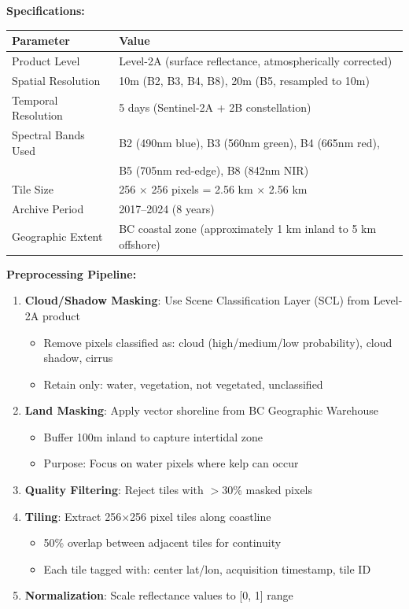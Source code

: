 \documentclass[11pt]{article}
\begin{document}
\textbf{Specifications:}
\begin{center}
\begin{tabular}{ll}
\toprule
\textbf{Parameter} & \textbf{Value} \\
\midrule
Product Level & Level-2A (surface reflectance, atmospherically corrected) \\
Spatial Resolution & 10m (B2, B3, B4, B8), 20m (B5, resampled to 10m) \\
Temporal Resolution & 5 days (Sentinel-2A + 2B constellation) \\
Spectral Bands Used & B2 (490nm blue), B3 (560nm green), B4 (665nm red), \\
 & B5 (705nm red-edge), B8 (842nm NIR) \\
Tile Size & 256 $\times$ 256 pixels = 2.56 km $\times$ 2.56 km \\
Archive Period & 2017--2024 (8 years) \\
Geographic Extent & BC coastal zone (approximately 1 km inland to 5 km offshore) \\
\bottomrule
\end{tabular}
\end{center}

\textbf{Preprocessing Pipeline:}
\begin{enumerate}
    \item \textbf{Cloud/Shadow Masking}: Use Scene Classification Layer (SCL) from Level-2A product
    \begin{itemize}
        \item Remove pixels classified as: cloud (high/medium/low probability), cloud shadow, cirrus
        \item Retain only: water, vegetation, not vegetated, unclassified
    \end{itemize}

    \item \textbf{Land Masking}: Apply vector shoreline from BC Geographic Warehouse
    \begin{itemize}
        \item Buffer 100m inland to capture intertidal zone
        \item Purpose: Focus on water pixels where kelp can occur
    \end{itemize}

    \item \textbf{Quality Filtering}: Reject tiles with $>$30\% masked pixels

    \item \textbf{Tiling}: Extract 256$\times$256 pixel tiles along coastline
    \begin{itemize}
        \item 50\% overlap between adjacent tiles for continuity
        \item Each tile tagged with: center lat/lon, acquisition timestamp, tile ID
    \end{itemize}

    \item \textbf{Normalization}: Scale reflectance values to [0, 1] range
\end{enumerate}
\end{document}
